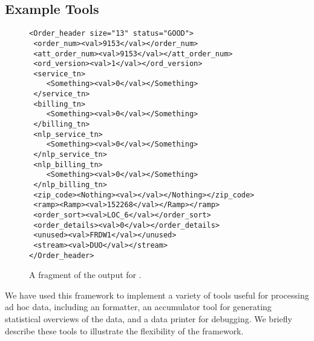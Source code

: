 \subsection{Example Tools}
\label{sec:gentool-motivation-ex}

\begin{figure}
  \centering
  \scriptsize
\begin{verbatim}
<Order_header size="13" status="GOOD">
 <order_num><val>9153</val></order_num>
 <att_order_num><val>9153</val></att_order_num>
 <ord_version><val>1</val></ord_version>
 <service_tn>
    <Something><val>0</val></Something>
 </service_tn>
 <billing_tn>
    <Something><val>0</val></Something>
 </billing_tn>
 <nlp_service_tn>
    <Something><val>0</val></Something>
 </nlp_service_tn>
 <nlp_billing_tn>
    <Something><val>0</val></Something>
 </nlp_billing_tn>
 <zip_code><Nothing><val></val></Nothing></zip_code>
 <ramp><Ramp><val>152268</val></Ramp></ramp>
 <order_sort><val>LOC_6</val></order_sort>
 <order_details><val>0</val></order_details>
 <unused><val>FRDW1</val></unused>
 <stream><val>DUO</val></stream>
</Order_header>
\end{verbatim}  
  \caption{A fragment of the \xml{} output for \dibbler{}. }
  \label{fig:gentool-xml-output}
\end{figure}

We have used this framework to implement a variety of tools useful for processing ad hoc data, including an \xml{} formatter, an accumulator tool for generating statistical overviews of the data, and a data printer for debugging.  We briefly describe these tools to illustrate the flexibility of the framework.

